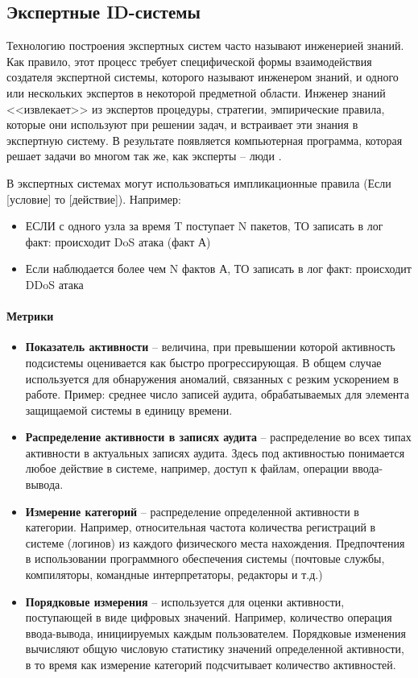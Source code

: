 \subsection{Экспертные ID-системы}

Технологию построения экспертных систем часто называют инженерией знаний. Как правило, этот процесс требует специфической формы взаимодействия создателя экспертной системы, которого называют инженером знаний, и одного или нескольких экспертов в некоторой предметной области.  Инженер знаний <<извлекает>> из экспертов процедуры, стратегии,  эмпирические правила, которые они используют при решении задач, и  встраивает эти знания в экспертную систему. В результате появляется   компьютерная программа, которая решает задачи во многом так же, как   эксперты -- люди \autocite{ExpertSystems}.

В экспертных системах могут использоваться импликационные правила (Если [условие] то [действие]). Например:
\begin{itemize}
	\item ЕСЛИ с одного узла за время T поступает N пакетов, ТО записать в лог факт: происходит DoS атака (факт А)
	\item Если наблюдается более чем N фактов А, ТО записать в лог факт: происходит DDoS атака
\end{itemize}

\paragraph{Метрики}

\begin{itemize}
	\item \textbf{Показатель активности} -- величина, при превышении которой активность подсистемы оценивается как быстро прогрессирующая. В общем случае используется для обнаружения аномалий, связанных с резким ускорением в работе. Пример: среднее число записей аудита, обрабатываемых для элемента защищаемой системы в единицу времени.
	\item \textbf{Распределение активности в записях аудита} -- распределение во всех типах активности в актуальных записях аудита. Здесь под активностью понимается любое действие в системе, например, доступ к файлам, операции ввода-вывода.
	\item \textbf{Измерение категорий} -- распределение определенной активности в категории\footnotemark. Например, относительная частота количества регистраций в системе (логинов) из каждого физического места нахождения. Предпочтения в использовании программного обеспечения системы (почтовые службы, компиляторы, командные интерпретаторы, редакторы и т.д.)
	\item \textbf{Порядковые измерения} -- используется для оценки активности, поступающей в виде цифровых значений. Например, количество операция ввода-вывода, инициируемых каждым пользователем. Порядковые изменения вычисляют общую числовую статистику значений определенной активности, в то время как измерение категорий подсчитывает количество активностей.
\end{itemize}


